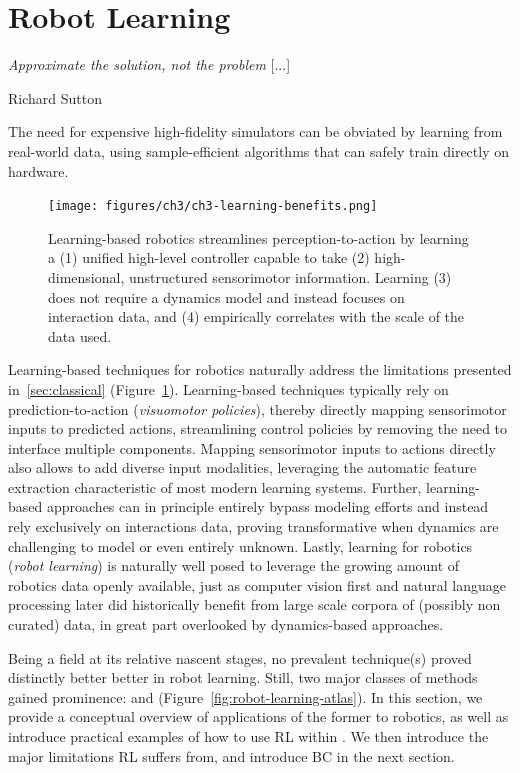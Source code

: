 \section{Robot Learning}
\label{sec:learning}

\epigraph{\textit{Approximate the solution, not the problem} [...]}{Richard Sutton}

\begin{tldr}
The need for expensive high-fidelity simulators can be obviated by learning from real-world data, using sample-efficient algorithms that can safely train directly on hardware.
\end{tldr}

\begin{figure}
    \centering
    \texttt{[image: figures/ch3/ch3-learning-benefits.png]}
    \caption{Learning-based robotics streamlines perception-to-action by learning a (1) unified high-level controller capable to take (2) high-dimensional, unstructured sensorimotor information. Learning (3) does not require a dynamics model and instead focuses on interaction data, and (4) empirically correlates with
    the scale of the data used.
    }
    \label{fig:robot-learning-upsides}
\end{figure}

Learning-based techniques for robotics naturally address the limitations presented in~\ref{sec:classical} (Figure~\ref{fig:robot-learning-upsides}).
Learning-based techniques typically rely on prediction-to-action (\emph{visuomotor policies}), thereby directly mapping sensorimotor inputs to predicted actions, streamlining control policies by removing the need to interface multiple components.
Mapping sensorimotor inputs to actions directly also allows to add diverse input modalities, leveraging the automatic feature extraction characteristic of most modern learning systems.
Further, learning-based approaches can in principle entirely bypass modeling efforts and instead rely exclusively on interactions data, proving transformative when dynamics are challenging to model or even entirely unknown.
Lastly, learning for robotics (\emph{robot learning}) is naturally well posed to leverage the growing amount of robotics data openly available, just as computer vision first and natural language processing later did historically benefit from large scale corpora of (possibly non curated) data, in great part overlooked by dynamics-based approaches.

Being a field at its relative nascent stages, no prevalent technique(s) proved distinctly better better in robot learning.
Still, two major classes of methods gained prominence:  and  (Figure~\ref{fig:robot-learning-atlas}).
In this section, we provide a conceptual overview of applications of the former to robotics, as well as introduce practical examples of how to use RL within \lerobot.
We then introduce the major limitations RL suffers from, and introduce BC in the next section.


